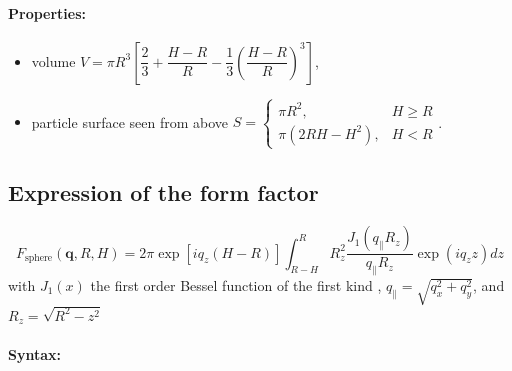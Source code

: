 \paragraph{Properties:}
\begin{itemize}
\item volume $V=\pi R^3 \left[\dfrac{2}{3} + \dfrac{H-R}{R} - \dfrac{1}{3}\left(\dfrac{H-R}{R}\right)^3\right]$,
\item particle surface seen from above $S = \left\{\begin{array}{ll} \pi R^2, & H \geq R \\
         \pi\left(2RH-H^2\right), & H < R \end{array}\right. $.
\end{itemize}

\subsection{Expression of the form factor}
\begin{equation}  
F_{\text{sphere}}(\mathbf{q},R, H)= 2\pi \exp[i q_z (H-R)]\int_{R-H} ^{R} R_z^2 \frac{J_1(q_{\parallel} R_z) }{q_{\parallel} R_z} \exp(i q_z z) dz
\label{eq:ffsphere}
\end{equation}
with $J_1(x)$ the first order
Bessel function of the first kind \cite{AbSt64}, $q_{\parallel} =
\sqrt{q_x^2+q_y^2}$, and $R_z = \sqrt{R^2-z^2}$

\paragraph{Syntax:} 

